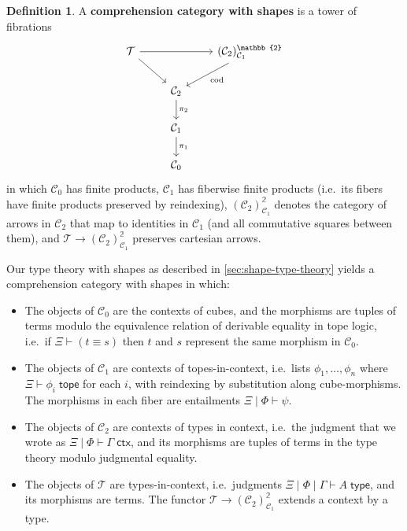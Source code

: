 \documentclass{amsart}
\theoremstyle{plain}
\theoremstyle{definition}
\newtheorem{defn}[thm]{Definition}
\theoremstyle{remark}
\numberwithin{equation}{section}
\newcommand{\jdeq}{\equiv}
\newcommand{\types}{\vdash}
\newcommand{\type}{\;\mathsf{type}}
\newcommand{\tope}{\;\mathsf{tope}}
\newcommand{\ctx}{\;\mathsf{ctx}}
\newcommand{\two}{\mathbb{2}}
\newcommand{\C}{\mathcal{C}}
\newcommand{\T}{\mathcal{T}}
\begin{document}
\begin{defn}
  A \textbf{comprehension category with shapes} is a tower of fibrations
  \[
  \begin{tikzcd}
    \T \ar[rr] \ar[dr] && (\C_2)^\two_{\C_1} \ar[dl,"\mathrm{cod}"] \\ &\C_2 \ar[d, "\pi_2"]\\ & \C_1 \ar[d,"\pi_1"] \\ & \C_0
  \end{tikzcd}
  \]
  in which $\C_0$ has finite products, $\C_1$ has fiberwise finite products (i.e.\ its fibers have finite products preserved by reindexing), $(\C_2)^\two_{\C_1}$ denotes the category of arrows in $\C_2$ that map to identities in $\C_1$ (and all commutative squares between them), and $\T\to(\C_2)^\two_{\C_1}$ preserves cartesian arrows.
\end{defn}

Our type theory with shapes as described in \cref{sec:shape-type-theory} yields a comprehension category with shapes in which:
\begin{itemize}
\item The objects of $\C_0$ are the contexts of cubes, and the morphisms are tuples of terms modulo the equivalence relation of derivable equality in tope logic, i.e.\ if $\Xi\types (t\jdeq s)$ then $t$ and $s$ represent the same morphism in $\C_0$.
\item The objects of $\C_1$ are contexts of topes-in-context, i.e.\ lists $\phi_1,\dots,\phi_n$ where $\Xi\types \phi_i\tope$ for each $i$, with reindexing by substitution along cube-morphisms.
  The morphisms in each fiber are entailments $\Xi\mid\Phi\types\psi$.
\item The objects of $\C_2$ are contexts of types in context, i.e.\ the judgment that we wrote as $\Xi\mid\Phi\types \Gamma\ctx$, and its morphisms are tuples of terms in the type theory modulo judgmental equality.
\item The objects of $\T$ are types-in-context, i.e.\ judgments $\Xi\mid\Phi\mid\Gamma\types A\type$, and its morphisms are terms.
  The functor $\T \to (\C_2)^\two_{\C_1}$ extends a context by a type.
\end{itemize}
\end{document}
